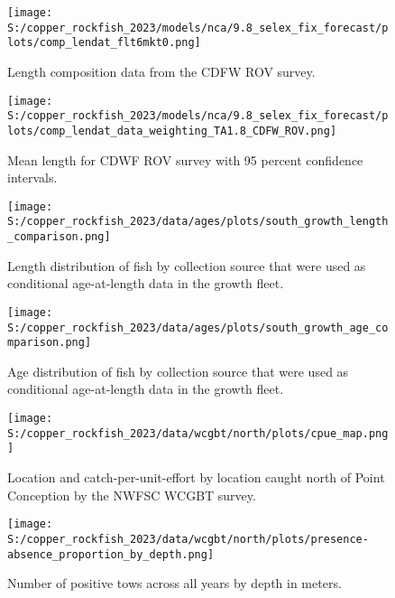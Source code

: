 \documentclass[
  letterpaper,
]{article}
\begin{document}
\pagebreak

\begin{figure}
\centering
\texttt{[image: S:/copper\_rockfish\_2023/models/nca/9.8\_selex\_fix\_forecast/plots/comp\_lendat\_flt6mkt0.png]}
\caption{Length composition data from the CDFW ROV survey.\label{fig:rov-len-data}}
\end{figure}

\pagebreak

\begin{figure}
\centering
\texttt{[image: S:/copper\_rockfish\_2023/models/nca/9.8\_selex\_fix\_forecast/plots/comp\_lendat\_data\_weighting\_TA1.8\_CDFW\_ROV.png]}
\caption{Mean length for CDWF ROV survey with 95 percent confidence intervals.\label{fig:mean-rov-len-data}}
\end{figure}

\pagebreak

\begin{figure}
\centering
\texttt{[image: S:/copper\_rockfish\_2023/data/ages/plots/south\_growth\_length\_comparison.png]}
\caption{Length distribution of fish by collection source that were used as conditional age-at-length data in the growth fleet.\label{fig:growth-len-dist}}
\end{figure}

\pagebreak

\begin{figure}
\centering
\texttt{[image: S:/copper\_rockfish\_2023/data/ages/plots/south\_growth\_age\_comparison.png]}
\caption{Age distribution of fish by collection source that were used as conditional age-at-length data in the growth fleet.\label{fig:growth-age-dist}}
\end{figure}

\pagebreak

\begin{figure}
\centering
\texttt{[image: S:/copper\_rockfish\_2023/data/wcgbt/north/plots/cpue\_map.png]}
\caption{Location and catch-per-unit-effort by location caught north of Point Conception by the NWFSC WCGBT survey.\label{fig:wcgbt-cpue}}
\end{figure}

\pagebreak

\begin{figure}
\centering
\texttt{[image: S:/copper\_rockfish\_2023/data/wcgbt/north/plots/presence-absence\_proportion\_by\_depth.png]}
\caption{Number of positive tows across all years by depth in meters.\label{fig:wcgbt-depth}}
\end{figure}
\end{document}
